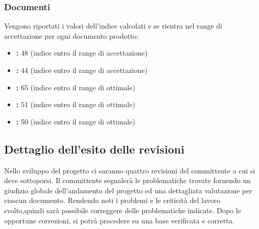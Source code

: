 \documentclass[12pt,a4paper]{article}
\begin{document}
\subsubsection{Documenti}
Vengono riportati i valori dell'indice  calcolati e se rientra nel range di accettazione per ogni documento prodotto:
\begin{itemize}
	\item \textbf{\NdP{}:} 48 (indice entro il range di accettazione)
	\item \textbf{\SdF{}:} 44 (indice entro il range di accettazione)
	\item \textbf{\AdR{}:} 65 (indice entro il range di ottimale)
	\item \textbf{\PdP{}:} 51 (indice entro il range di ottimale)
	\item \textbf{\PdQ{}:} 50 (indice entro il range di ottimale)
\end{itemize}
\subsection{Dettaglio dell'esito delle revisioni}
Nello sviluppo del progetto ci saranno quattro revisioni del committente a cui si deve sottoporsi. Il committente segnalerà le problematiche trovate fornendo un giudizio globale dell'andamento del progetto ed una dettagliata valutazione per ciascun documento. Rendendo noti i problemi e le criticità del lavoro svolto,quindi sarà possibile correggere delle problematiche indicate. Dopo le opportune correzioni, si potrà procedere su una base verificata e corretta.

\newpage
\printglossary[title={Glossario}]
\end{document}

